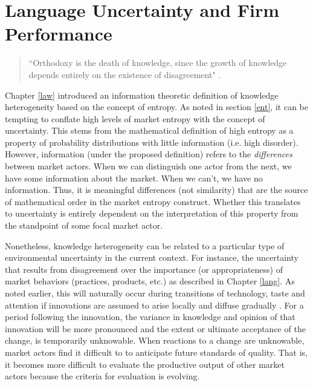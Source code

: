 \chapter{Language Uncertainty and Firm Performance \label{signal}}


\begin{small}
\begin{quote}
``Orthodoxy is the death of knowledge, since the growth of knowledge depends entirely on the existence of disagreement" \citep[p. 34]{popper1994}.
\end{quote}
\end{small}

Chapter \ref{law} introduced an information theoretic definition of knowledge heterogeneity based on the concept of entropy. As noted in section \ref{ent}, it can be tempting to conflate high levels of market entropy with the concept of uncertainty. This stems from the mathematical definition of high entropy as a property of probability distributions with little information (i.e. high disorder). However, information (under the proposed definition) refers to the \emph{differences} between market actors. When we can distinguish one actor from the next, we have some information about the market. When we can't, we have no information. Thus, it is meaningful differences (not similarity) that are the source of mathematical order in the market entropy construct. Whether this translates to uncertainty is entirely dependent on the interpretation of this property from the standpoint of some focal market actor.

Nonetheless, knowledge heterogeneity can be related to a particular type of environmental uncertainty in the current context. For instance, the uncertainty that results from disagreement over the importance (or appropriateness) of market behaviors (practices, products, etc.) as described in Chapter \ref{lang}. As noted earlier, this will naturally occur during transitions of technology, taste and attention if innovations are assumed to arise locally and diffuse gradually \citep{colyvas2007, rogers2002}. For a period following the innovation, the variance in knowledge and opinion of that innovation will be more pronounced and the extent or ultimate acceptance of the change, is temporarily unknowable. When reactions to a change are unknowable, market actors find it difficult to to anticipate future standards of quality. That is, it becomes more difficult to evaluate the productive output of other market actors because the criteria for evaluation is evolving.

